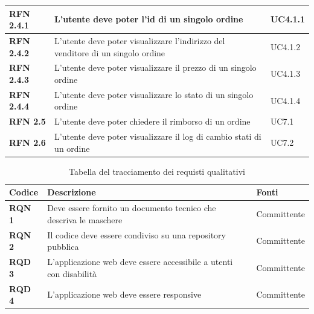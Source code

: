 \begin{longtable}[c]{|l|p{9cm}|l|}
\textbf{RFN 2.4.1} & L’utente deve poter l'id di un singolo ordine & UC4.1.1 \\ \hline

\textbf{RFN 2.4.2} & L’utente deve poter visualizzare l'indirizzo del venditore di un singolo ordine & UC4.1.2 \\ \hline

\textbf{RFN 2.4.3} & L’utente deve poter visualizzare il prezzo di un singolo ordine & UC4.1.3 \\ \hline

\textbf{RFN 2.4.4} & L’utente deve poter visualizzare lo stato di un singolo ordine & UC4.1.4 \\ \hline

\textbf{RFN 2.5} & L’utente deve poter chiedere il rimborso di un ordine & UC7.1 \\ \hline

\textbf{RFN 2.6} & L’utente deve poter visualizzare il log di cambio stati di un ordine & UC7.2 \\ \hline

\end{longtable}

\begin{longtable}[c]{|l|p{9cm}|l|}
\caption{Tabella del tracciamento dei requisti qualitativi}
\label{tab:requisiti-qualitativi}
\hline
\rowcolor{gray!40}
\textbf{Codice} &
\textbf{Descrizione} &
\textbf{Fonti} \\ \hline
\endhead

\textbf{RQN 1} & Deve essere fornito un documento tecnico che descriva le maschere & Committente \\ \hline

\textbf{RQN 2} & Il codice deve essere condiviso su una repository pubblica & Committente\\ \hline

\textbf{RQD 3} & L’applicazione web deve essere accessibile a utenti con disabilità & Committente\\ \hline

\textbf{RQD 4} & L’applicazione web deve essere responsive & Committente\\ \hline

\end{longtable}